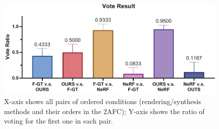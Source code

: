 \begin{figure}[ht]
    \centering
    \includegraphics[width=0.96\linewidth]{TOG/figs/vote-average-mono.pdf}
    {%
    X-axis shows all pairs of ordered conditions (rendering/synthesis methods and their orders in the 2AFC); Y-axis shows the ratio of voting for the first one in each pair.
    }
    \label{fig:results:2afc}
\end{figure}